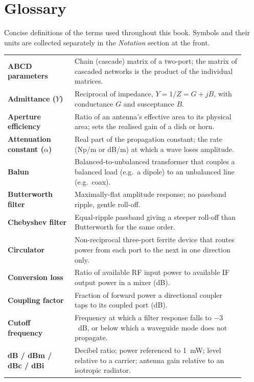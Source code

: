 \chapter{Glossary}\label{ch:glossary}

Concise definitions of the terms used throughout this book. Symbols and their
units are collected separately in the \emph{Notation} section at the front.

\begin{longtable}{>{\raggedright\arraybackslash}p{0.26\linewidth}>{\raggedright\arraybackslash}p{0.66\linewidth}}
\hline
\textbf{ABCD parameters} & Chain (cascade) matrix of a two-port; the matrix of cascaded networks is the product of the individual matrices. \\
\textbf{Admittance ($Y$)} & Reciprocal of impedance, $Y=1/Z=G+jB$, with conductance $G$ and susceptance $B$. \\
\textbf{Aperture efficiency} & Ratio of an antenna's effective area to its physical area; sets the realised gain of a dish or horn. \\
\textbf{Attenuation constant ($\alpha$)} & Real part of the propagation constant; the rate (Np/m or dB/m) at which a wave loses amplitude. \\
\textbf{Balun} & Balanced-to-unbalanced transformer that couples a balanced load (e.g.\ a dipole) to an unbalanced line (e.g.\ coax). \\
\textbf{Butterworth filter} & Maximally-flat amplitude response; no passband ripple, gentle roll-off. \\
\textbf{Chebyshev filter} & Equal-ripple passband giving a steeper roll-off than Butterworth for the same order. \\
\textbf{Circulator} & Non-reciprocal three-port ferrite device that routes power from each port to the next in one direction only. \\
\textbf{Conversion loss} & Ratio of available RF input power to available IF output power in a mixer (dB). \\
\textbf{Coupling factor} & Fraction of forward power a directional coupler taps to its coupled port (dB). \\
\textbf{Cutoff frequency} & Frequency at which a filter response falls to $-3$~dB, or below which a waveguide mode does not propagate. \\
\textbf{dB / dBm / dBc / dBi} & Decibel ratio; power referenced to 1~mW; level relative to a carrier; antenna gain relative to an isotropic radiator. \\

\end{longtable}
